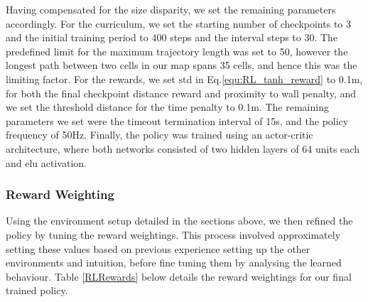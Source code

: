 \documentclass{report_template_oxford}
\begin{document}
Having compensated for the size disparity, we set the remaining parameters accordingly. For the curriculum, we set the starting number of checkpoints to 3 and the initial training period to 400 steps and the interval steps to 30. The predefined limit for the maximum trajectory length was set to 50, however the longest path between two cells in our map spans 35 cells, and hence this was the limiting factor. For the rewards, we set $\mathrm{std}$ in Eq.\ref{equ:RL_tanh_reward} to 0.1m, for both the final checkpoint distance reward and proximity to wall penalty, and we set the threshold distance for the time penalty to 0.1m. The remaining parameters we set were the timeout termination interval of 15s, and the policy frequency of 50Hz. Finally, the policy was trained using an actor-critic architecture, where both networks consisted of two hidden layers of 64 units each and \gls{elu} activation.


\subsubsection{Reward Weighting}

Using the environment setup detailed in the sections above, we then refined the policy by tuning the reward weightings. This process involved approximately setting these values based on previous experience setting up the other environments and intuition, before fine tuning them by analysing the learned behaviour. Table \ref{RLRewards} below details the reward weightings for our final trained policy.
\end{document}
